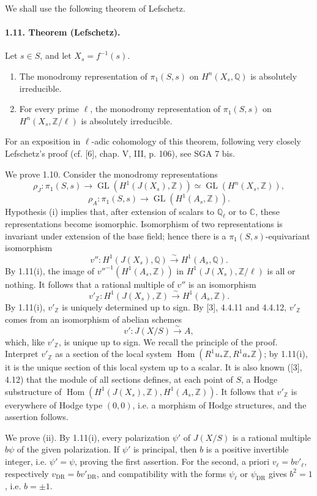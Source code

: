 \documentclass[10pt]{article}
\newcommand{\C}{\mathbb C}
\newcommand{\Q}{\mathbb Q}
\newcommand{\Z}{\mathbb Z}
\newcommand{\DR}{\mathrm{DR}}
\newcommand{\GL}{\operatorname{GL}}
\newcommand{\Hom}{\operatorname{Hom}}
\newcommand{\iso}{\xrightarrow{\sim}}
\begin{document}
We shall use the following theorem of Lefschetz.

\paragraph{1.11. Theorem (Lefschetz).} Let \(s\in S\), and let \(X_s=f^{-1}(s)\).
\begin{enumerate}[label=(\roman*)]
\item The monodromy representation of \(\pi_1(S,s)\) on \(H^n(X_s,\Q)\) is absolutely irreducible.
\item For every prime \(\ell\), the monodromy representation of \(\pi_1(S,s)\) on \(H^n(X_s,\Z/\ell)\) is absolutely irreducible.
\end{enumerate}
For an exposition in \(\ell\)-adic cohomology of this theorem, following very closely Lefschetz's proof (cf. [6], chap. V, III, p. 106), see SGA 7 bis.

We prove 1.10. Consider the monodromy representations
\[
\rho_J:\pi_1(S,s)\to\GL(H^1(J(X_s),\Z))\simeq\GL(H^n(X_s,\Z)),
\]
\[
\rho_A:\pi_1(S,s)\to\GL(H^1(A_s,\Z)).
\]
Hypothesis (i) implies that, after extension of scalars to \(\Q_\ell\) or to \(\C\), these representations become isomorphic. Isomorphism of two representations is invariant under extension of the base field; hence there is a \(\pi_1(S,s)\)-equivariant isomorphism
\[
v'':H^1(J(X_s),\Q)\iso H^1(A_s,\Q).
\]
By 1.11(i), the image of \(v''^{-1}(H^1(A_s,\Z))\) in \(H^1(J(X_s),\Z/\ell)\) is all or nothing. It follows that a rational multiple of \(v''\) is an isomorphism
\[
v'_\Z:H^1(J(X_s),\Z)\iso H^1(A_s,\Z).
\]
By 1.11(i), \(v'_\Z\) is uniquely determined up to sign. By [3], 4.4.11 and 4.4.12, \(v'_\Z\) comes from an isomorphism of abelian schemes
\[
v':J(X/S)\iso A,
\]
which, like \(v'_\Z\), is unique up to sign. We recall the principle of the proof. Interpret \(v'_\Z\) as a section of the local system \(\Hom(R^1u_*\Z,R^1a_*\Z)\); by 1.11(i), it is the unique section of this local system up to a scalar. It is also known ([3], 4.12) that the module of all sections defines, at each point of \(S\), a Hodge substructure of \(\Hom(H^1(J(X_s),\Z),H^1(A_s,\Z))\). It follows that \(v'_\Z\) is everywhere of Hodge type \((0,0)\), i.e. a morphism of Hodge structures, and the assertion follows.

We prove (ii). By 1.11(i), every polarization \(\psi'\) of \(J(X/S)\) is a rational multiple \(b\psi\) of the given polarization. If \(\psi'\) is principal, then \(b\) is a positive invertible integer, i.e. \(\psi'=\psi\), proving the first assertion. For the second, a priori \(v_\ell=bv'_\ell\), respectively \(v_{\DR}=bv'_{\DR}\), and compatibility with the forms \(\psi_\ell\) or \(\psi_{\DR}\) gives \(b^2=1\), i.e. \(b=\pm1\).
\end{document}
